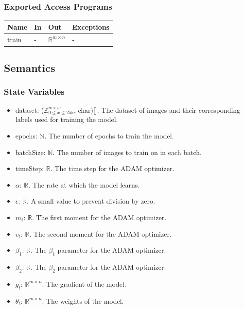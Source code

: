 \documentclass[12pt, titlepage]{article}
\begin{document}
\subsubsection{Exported Access Programs}

\begin{center}
\begin{tabular}{p{2cm} p{4cm} p{4cm} p{2cm}}
\hline
\textbf{Name} & \textbf{In} & \textbf{Out} & \textbf{Exceptions} \\
\hline
train & - & $\mathbb{R}^{m \times n}$ & - \\
\hline
\end{tabular}
\end{center}

\subsection{Semantics}

\subsubsection{State Variables}

\begin{itemize}
  \item dataset: ($\mathbb{Z}^{w \times w}_{0 \le x \le 255}$, char)[]. The
  dataset of images and their corresponding labels used for training the model.
  \item epochs: $\mathbb{N}$. The number of epochs to train the model.
  \item batchSize: $\mathbb{N}$. The number of images to train on in each batch.
  \item timeStep: $\mathbb{R}$. The time step for the ADAM optimizer.
  \item $\alpha$: $\mathbb{R}$. The rate at which the model learns.
  \item $\epsilon$: $\mathbb{R}$. A small value to prevent division by zero.
  \item $m_{t}$: $\mathbb{R}$. The first moment for the ADAM optimizer.
  \item $v_{t}$: $\mathbb{R}$. The second moment for the ADAM optimizer.
  \item $\beta_1$: $\mathbb{R}$. The $\beta_1$ parameter for the ADAM optimizer.
  \item $\beta_2$: $\mathbb{R}$. The $\beta_2$ parameter for the ADAM optimizer.
  \item $g_{t}$: $\mathbb{R}^{m \times n}$. The gradient of the model. 
  \item $\theta_{t}$: $\mathbb{R}^{m \times n}$. The weights of the model.
\end{itemize}
\end{document}

